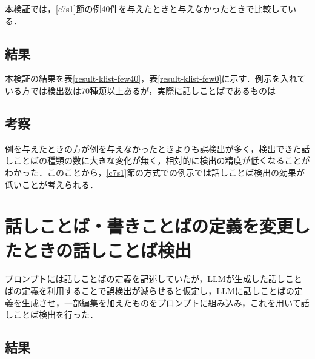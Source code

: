 本検証では，\ref{c7s1}節の例40件を与えたときと与えなかったときで比較している．

\subsection{結果}
本検証の結果を表\ref{result-klist-few40}，表\ref{result-klist-few0}に示す．例示を入れている方では検出数は70種類以上あるが，実際に話しことばであるものは



\subsection{考察}
例を与えたときの方が例を与えなかったときよりも誤検出が多く，検出できた話しことばの種類の数に大きな変化が無く，相対的に検出の精度が低くなることがわかった．このことから，\ref{c7s1}節の方式での例示では話しことば検出の効果が低いことが考えられる．

\section{話しことば・書きことばの定義を変更したときの話しことば検出 \label{c7s3}}
プロンプトには話しことばの定義を記述していたが，LLMが生成した話しことばの定義を利用することで誤検出が減らせると仮定し，LLMに話しことばの定義を生成させ，一部編集を加えたものをプロンプトに組み込み，これを用いて話しことば検出を行った．



\subsection{結果}



